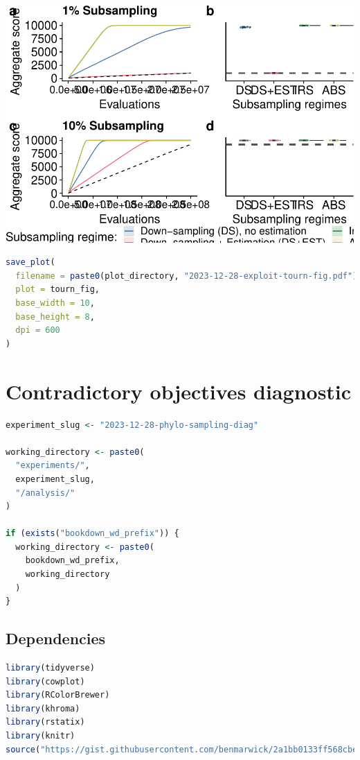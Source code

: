 \documentclass[
]{book}
\begin{document}
\includegraphics{phylogeny-informed-subsampling-supplemental_files/figure-latex/unnamed-chunk-25-1.pdf}

\begin{lstlisting}[language=R]
save_plot(
  filename = paste0(plot_directory, "2023-12-28-exploit-tourn-fig.pdf"),
  plot = tourn_fig,
  base_width = 10,
  base_height = 8,
  dpi = 600
)
\end{lstlisting}

\hypertarget{contradictory-objectives-diagnostic}{%
\chapter{Contradictory objectives diagnostic}\label{contradictory-objectives-diagnostic}}

\begin{lstlisting}[language=R]
experiment_slug <- "2023-12-28-phylo-sampling-diag"

working_directory <- paste0(
  "experiments/",
  experiment_slug,
  "/analysis/"
)

if (exists("bookdown_wd_prefix")) {
  working_directory <- paste0(
    bookdown_wd_prefix,
    working_directory
  )
}
\end{lstlisting}

\hypertarget{dependencies-1}{%
\section{Dependencies}\label{dependencies-1}}

\begin{lstlisting}[language=R]
library(tidyverse)
library(cowplot)
library(RColorBrewer)
library(khroma)
library(rstatix)
library(knitr)
source("https://gist.githubusercontent.com/benmarwick/2a1bb0133ff568cbe28d/raw/fb53bd97121f7f9ce947837ef1a4c65a73bffb3f/geom_flat_violin.R")
\end{lstlisting}
\end{document}
